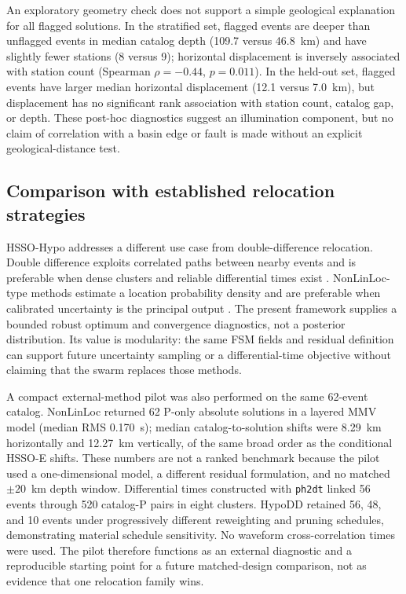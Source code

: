 \documentclass[10pt]{article}
\begin{document}
An exploratory geometry check does not support a simple geological explanation for all flagged solutions. In the stratified set, flagged events are deeper than unflagged events in median catalog depth (109.7 versus 46.8~km) and have slightly fewer stations (8 versus 9); horizontal displacement is inversely associated with station count (Spearman $\rho=-0.44$, $p=0.011$). In the held-out set, flagged events have larger median horizontal displacement (12.1 versus 7.0~km), but displacement has no significant rank association with station count, catalog gap, or depth. These post-hoc diagnostics suggest an illumination component, but no claim of correlation with a basin edge or fault is made without an explicit geological-distance test.

\subsection{Comparison with established relocation strategies}

HSSO-Hypo addresses a different use case from double-difference relocation. Double difference exploits correlated paths between nearby events and is preferable when dense clusters and reliable differential times exist \citep{WaldhauserEllsworth2000}. NonLinLoc-type methods estimate a location probability density and are preferable when calibrated uncertainty is the principal output \citep{Lomax2000}. The present framework supplies a bounded robust optimum and convergence diagnostics, not a posterior distribution. Its value is modularity: the same FSM fields and residual definition can support future uncertainty sampling or a differential-time objective without claiming that the swarm replaces those methods.

A compact external-method pilot was also performed on the same 62-event catalog. NonLinLoc returned 62 P-only absolute solutions in a layered MMV model (median RMS 0.170~s); median catalog-to-solution shifts were 8.29~km horizontally and 12.27~km vertically, of the same broad order as the conditional HSSO-E shifts. These numbers are not a ranked benchmark because the pilot used a one-dimensional model, a different residual formulation, and no matched $\pm20$~km depth window. Differential times constructed with \texttt{ph2dt} linked 56 events through 520 catalog-P pairs in eight clusters. HypoDD retained 56, 48, and 10 events under progressively different reweighting and pruning schedules, demonstrating material schedule sensitivity. No waveform cross-correlation times were used. The pilot therefore functions as an external diagnostic and a reproducible starting point for a future matched-design comparison, not as evidence that one relocation family wins.
\end{document}
